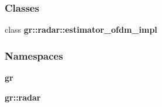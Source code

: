 \subsubsection*{Classes}
\begin{DoxyCompactItemize}
\item 
class {\bf gr\+::radar\+::estimator\+\_\+ofdm\+\_\+impl}
\end{DoxyCompactItemize}
\subsubsection*{Namespaces}
\begin{DoxyCompactItemize}
\item 
 {\bf gr}
\item 
 {\bf gr\+::radar}
\end{DoxyCompactItemize}

